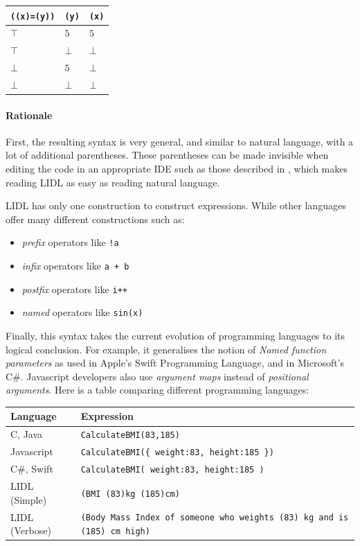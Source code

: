 \documentclass[10pt]{sigplanconf}
\newcommand{\code}[1]{\lstinline{#1}}
\begin{document}
\begin{tabularx}{\linewidth}{XX|X}
  \texttt{((x)=(y))} & \texttt{(y)}&\texttt{(x)} \\
  \hline
  $\top$ & $5$ & $5$ \\
  $\top$ & $\bot$ & $\bot$ \\
  $\bot$ & $5$ & $\bot$ \\
  $\bot$ & $\bot$ & $\bot$ \\
\end{tabularx}


\paragraph{Rationale}

First, the resulting syntax is very general, and similar to natural language, with a lot of additional parentheses. These parentheses can be made invisible when editing the code in an appropriate IDE such as those described in \cite{Voelter:2014aa}, which makes reading LIDL as easy as reading natural language.

LIDL has only one construction to construct expressions. While other languages offer many different constructions such as:
\begin{itemize}
  \item \emph{prefix} operators like \code{!a}
  \item \emph{infix} operators like \code{a + b}
  \item \emph{postfix} operators like \code{i++}
  \item \emph{named} operators like \code{sin(x)}
\end{itemize}

Finally, this syntax takes the current evolution of programming languages to its logical conclusion. For example, it generalises the notion of \emph{Named function parameters} as used in Apple's Swift Programming Language, and in Microsoft's C\#. Javascript developers also use \emph{argument maps} instead of \emph{positional arguments}. Here is a table comparing different programming languages:

\noindent
\begin{tabularx}{\linewidth}{l|X}
  Language & Expression \\
  \hline
 C, Java       & \texttt{CalculateBMI(83,185)}                                                  \\
Javascript    & \texttt{CalculateBMI(\{ weight:83, height:185 \})}                               \\
 C\#, Swift     & \texttt{CalculateBMI( weight:83, height:185 )}                                \\
 LIDL (Simple)  & \texttt{(BMI (83)kg (185)cm)}                                                 \\
 LIDL (Verbose) & \texttt{(Body Mass Index of someone who weights (83) kg and is (185) cm high)} \\
\end{tabularx}
\end{document}
